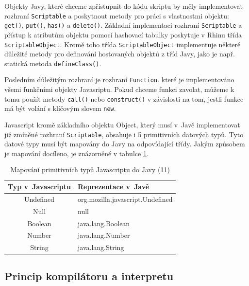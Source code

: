 Objekty Javy, které chceme zpřístupnit do kódu skriptu by měly implementovat rozhraní \texttt{Scriptable} a poskytnout metody pro práci s vlastnostmi objektu: \texttt{get()}, \texttt{put()}, \texttt{has()} a \texttt{delete()}. Základní implementaci rozhraní \texttt{Scriptable} a přístup k atributům objektu pomocí hashovací tabulky poskytuje v Rhinu třída \texttt{ScriptableObject}. Kromě toho třída \texttt{ScriptableObject} implementuje některé důležité metody pro definování hostovaných objektů z tříd Javy, jako je např. statická metoda \texttt{defineClass()}.

Posledním důležitým rozhraní je rozhraní \texttt{Function}. které je implementováno všemi funkčními objekty Javasriptu. Pokud chceme funkci zavolat, můžeme k tomu použít metody \texttt{call()} nebo \texttt{construct()} v závislosti na tom, jestli funkce má být volání s klíčovým slovem \texttt{new}.

Javascript kromě základního objektu Object, který musí v~Javě implementovat již zmíněné rozhraní \texttt{Scriptable}, obsahuje i 5 primitivních datových typů. Tyto datové typy musí být mapovány do Javy na odpovídající třídy. Jakým způsobem je mapování docíleno, je znázorněné v tabulce \ref{Table.JavaScriptToJavaMapping}. 

\begin{table}[H]
  \begin{center} 
    \begin{tabular}{| c | l |} \hline
    \textbf{Typ v~Javascriptu} & \textbf{Reprezentace v~Javě} \\ \hline
    Undefined & org.mozilla.javascript.Undefined \\ \hline
    Null & null \\ \hline
    Boolean & java.lang.Boolean  \\ \hline
    Number & java.lang.Number \\ \hline
    String & java.lang.String \\ \hline
    \end{tabular}
    \caption{Mapování primitivních typů Javascriptu do Javy (11)}
    \label{Table.JavaScriptToJavaMapping}
  \end{center}
\end{table}

\subsection{Princip kompilátoru a interpretu}
\label{Chapter.JavaScriptInJavaAnalysis.Rhino.CompilerTechniques}

